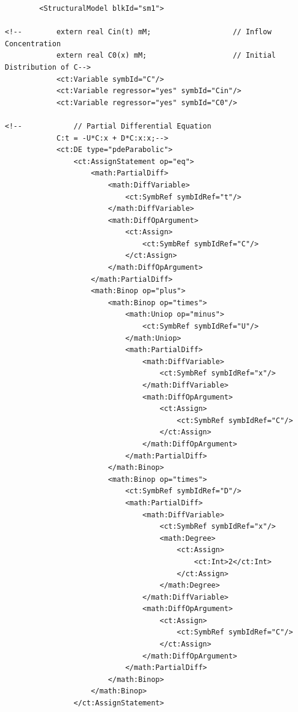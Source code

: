 \lstset{language=XML}
\begin{lstlisting}
        <StructuralModel blkId="sm1">

<!--        extern real Cin(t) mM;                   // Inflow Concentration
            extern real C0(x) mM;                    // Initial Distribution of C-->
            <ct:Variable symbId="C"/>
            <ct:Variable regressor="yes" symbId="Cin"/>
            <ct:Variable regressor="yes" symbId="C0"/>
            
<!--            // Partial Differential Equation
            C:t = -U*C:x + D*C:x:x;-->
            <ct:DE type="pdeParabolic">
                <ct:AssignStatement op="eq">
                    <math:PartialDiff>
                        <math:DiffVariable>
                            <ct:SymbRef symbIdRef="t"/>
                        </math:DiffVariable>
                        <math:DiffOpArgument>
                            <ct:Assign>
                                <ct:SymbRef symbIdRef="C"/>
                            </ct:Assign>
                        </math:DiffOpArgument>
                    </math:PartialDiff>
                    <math:Binop op="plus">
                        <math:Binop op="times">
                            <math:Uniop op="minus">
                                <ct:SymbRef symbIdRef="U"/>
                            </math:Uniop>
                            <math:PartialDiff>
                                <math:DiffVariable>
                                    <ct:SymbRef symbIdRef="x"/>
                                </math:DiffVariable>
                                <math:DiffOpArgument>
                                    <ct:Assign>
                                        <ct:SymbRef symbIdRef="C"/>
                                    </ct:Assign>
                                </math:DiffOpArgument>
                            </math:PartialDiff>
                        </math:Binop>
                        <math:Binop op="times">
                            <ct:SymbRef symbIdRef="D"/>
                            <math:PartialDiff>
                                <math:DiffVariable>
                                    <ct:SymbRef symbIdRef="x"/>
                                    <math:Degree>
                                        <ct:Assign>
                                            <ct:Int>2</ct:Int>
                                        </ct:Assign>
                                    </math:Degree>
                                </math:DiffVariable>
                                <math:DiffOpArgument>
                                    <ct:Assign>
                                        <ct:SymbRef symbIdRef="C"/>
                                    </ct:Assign>
                                </math:DiffOpArgument>
                            </math:PartialDiff>
                        </math:Binop>
                    </math:Binop>
                </ct:AssignStatement>
\end{lstlisting}


